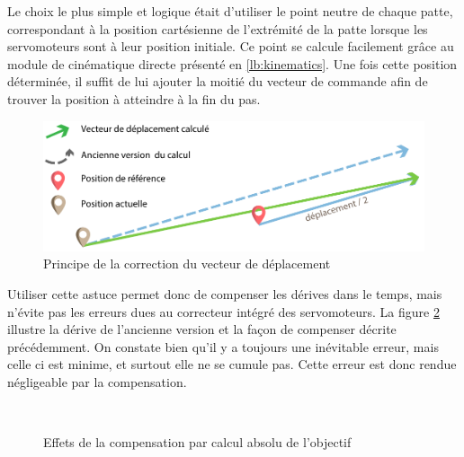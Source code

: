 \documentclass{tnreport}
\begin{document}
Le choix le plus simple et logique était d'utiliser le point neutre de chaque patte, correspondant à la position cartésienne de l'extrémité de la patte lorsque les servomoteurs sont à leur position initiale. Ce point se calcule facilement grâce au module de cinématique directe présenté en \ref{lb:kinematics}. Une fois cette position déterminée, il suffit de lui ajouter la moitié du vecteur de commande afin de trouver la position à atteindre à la fin du pas. 

\begin{figure}[h]
\centering
\includegraphics[width = 13cm]{figures/correctionprinc}
\caption{Principe de la correction du vecteur de déplacement}
\label{fig:comp}
\end{figure}

Utiliser cette astuce permet donc de compenser les dérives dans le temps, mais n'évite pas les erreurs dues au correcteur intégré des servomoteurs. La figure \ref{fig:corr} illustre la dérive de l'ancienne version et la façon de compenser décrite précédemment. On constate bien qu'il y a toujours une inévitable erreur, mais celle ci est minime, et surtout elle ne se cumule pas. Cette erreur est donc rendue négligeable par la compensation.   

\begin{figure}[h]
\centering
{}\qquad
{}\\
\caption{Effets de la compensation par calcul absolu de l'objectif}
\label{fig:corr}
\end{figure}
\end{document}
